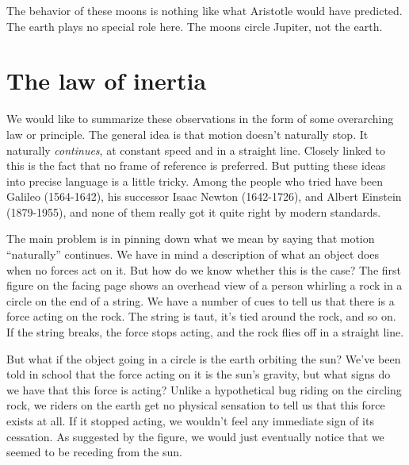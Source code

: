 The behavior of these moons is nothing like what Aristotle would have predicted. The earth
plays no special role here. The moons circle Jupiter, not the earth.

\begin{figure}
\end{figure}

\pagebreak

\section{The law of inertia}

We would like to summarize these observations in the form of some overarching law or
principle. The general idea is that motion doesn't naturally stop. It naturally
\emph{continues}, at constant speed and in a straight line.
Closely linked to this is the fact that no frame of reference is
preferred. But putting these ideas into precise language is a little tricky. Among the people who tried have been
Galileo (1564-1642), his successor Isaac Newton (1642-1726), and
Albert Einstein (1879-1955), and none of them really got it quite right by modern standards.

The main problem is in pinning down what we mean by saying that motion ``naturally'' continues. We have in mind
a description of what an object does when no forces act on it. But how do we know whether this is the case?
The first figure on the facing page shows an overhead view of a person whirling a rock in a circle on the end
of a string. We have a number of cues to tell us  that there is a force acting on the rock.
The string is taut, it's tied around the rock, and so on. If the string breaks, the force stops acting,
and the rock flies off in a straight line.

\begin{figure}
\end{figure}

But what if the object going in a circle is the earth orbiting the sun? We've been told in school
that the force acting on it is the sun's gravity, but what signs do we have that this force is acting?
Unlike a hypothetical bug riding on the circling rock, we riders on the earth get no physical sensation
to tell us that this force exists at all.
If it stopped acting, we wouldn't feel any immediate sign of its cessation.
As suggested by the figure, we would just eventually notice that we seemed to be receding from the sun.

